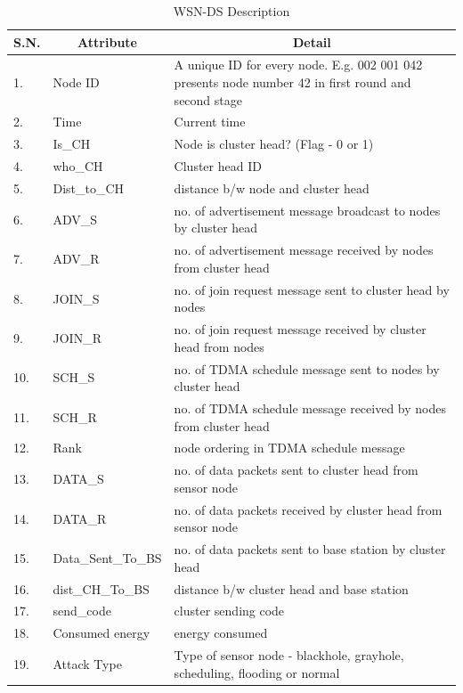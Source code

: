 \begin{longtable}[c]{|p{0.5in}|p{1.5in}|p{3.5in}|}
\caption{WSN-DS Description}
\label{tab:WSNDS}\\
\hline
\multicolumn{1}{|c|}{\textbf{S.N.}} & \multicolumn{1}{c|}{\textbf{Attribute}} & \multicolumn{1}{c|}{\textbf{Detail}} \\ \hline
\endfirsthead
%
\endhead
%
1. & Node ID & A unique ID for every node. E.g. 002 001 042 presents node number 42 in first round and second stage \\ \hline
2. & Time & Current time \\ \hline
3. & Is\_CH & Node is cluster head? (Flag - 0 or 1) \\ \hline
4. & who\_CH & Cluster head ID \\ \hline
5. & Dist\_to\_CH & distance b/w node and cluster head \\ \hline
6. & ADV\_S & no. of advertisement message broadcast to nodes by cluster head \\ \hline
7. & ADV\_R & no. of advertisement message received by nodes from cluster head \\ \hline
8. & JOIN\_S & no. of join request message sent to cluster head by nodes \\ \hline
9. & JOIN\_R & no. of join request message received by cluster head from nodes \\ \hline
10. & SCH\_S & no. of TDMA schedule message sent to nodes by cluster head \\ \hline
11. & SCH\_R & no. of TDMA schedule message received by nodes from cluster head \\ \hline
12. & Rank & node ordering in TDMA schedule message \\ \hline
13. & DATA\_S & no. of data packets sent to cluster head from sensor node \\ \hline
14. & DATA\_R & no. of data packets received by cluster head from sensor node \\ \hline
15. & Data\_Sent\_To\_BS & no. of data packets sent to base station by cluster head \\ \hline
16. & dist\_CH\_To\_BS & distance b/w cluster head and base station \\ \hline
17. & send\_code & cluster sending code \\ \hline
18. & Consumed energy & energy consumed \\ \hline
19. & Attack Type & Type of sensor node - blackhole, grayhole, scheduling, flooding or normal \\ \hline
\end{longtable}


